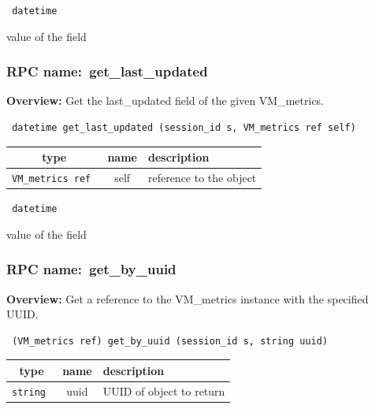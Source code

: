 \vspace{0.3cm}

{\tt 
datetime
}


value of the field
\vspace{0.3cm}
\vspace{0.3cm}
\vspace{0.3cm}
\subsubsection{RPC name:~get\_last\_updated}

{\bf Overview:} 
Get the last\_updated field of the given VM\_metrics.

\begin{verbatim} datetime get_last_updated (session_id s, VM_metrics ref self)\end{verbatim}



 
\vspace{0.3cm}
\begin{tabular}{|c|c|p{7cm}|}
 \hline
{\bf type} & {\bf name} & {\bf description} \\ \hline
{\tt VM\_metrics ref } & self & reference to the object \\ \hline 

\end{tabular}

\vspace{0.3cm}

{\tt 
datetime
}


value of the field
\vspace{0.3cm}
\vspace{0.3cm}
\vspace{0.3cm}
\subsubsection{RPC name:~get\_by\_uuid}

{\bf Overview:} 
Get a reference to the VM\_metrics instance with the specified UUID.

\begin{verbatim} (VM_metrics ref) get_by_uuid (session_id s, string uuid)\end{verbatim}



 
\vspace{0.3cm}
\begin{tabular}{|c|c|p{7cm}|}
 \hline
{\bf type} & {\bf name} & {\bf description} \\ \hline
{\tt string } & uuid & UUID of object to return \\ \hline 

\end{tabular}

